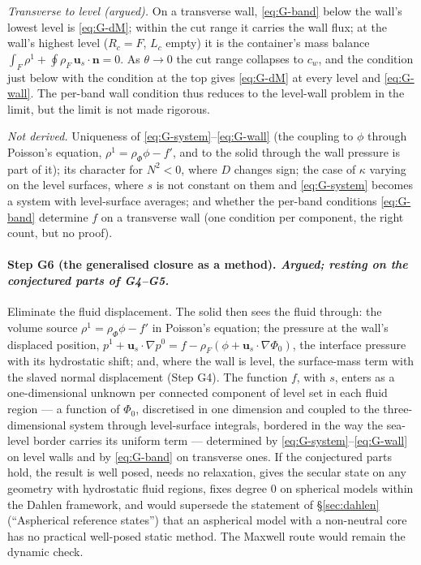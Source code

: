 \documentclass[11pt]{article}
\newcommand{\bu}{\mathbf{u}}
\newcommand{\bn}{\mathbf{n}}
\begin{document}
\emph{Transverse to level (argued).} On a transverse wall,
\eqref{eq:G-band} below the wall's lowest level is \eqref{eq:G-dM};
within the cut range it carries the wall flux; at the wall's highest
level ($R_c = F$, $L_c$ empty) it is the container's mass balance
$\int_F\rho^1 + \oint\rho_F\,\bu_s\cdot\bn = 0$. As $\theta \to 0$ the
cut range collapses to $c_w$, and the condition just below with the
condition at the top gives \eqref{eq:G-dM} at every level and
\eqref{eq:G-wall}. The per-band wall condition thus reduces to the
level-wall problem in the limit, but the limit is not made rigorous.

\emph{Not derived.} Uniqueness of \eqref{eq:G-system}--\eqref{eq:G-wall}
(the coupling to $\phi$ through Poisson's equation, $\rho^1 = \rho_\Phi\phi
- f'$, and to the solid through the wall pressure is part of it); its
character for $N^2 < 0$, where $D$ changes sign; the case of $\kappa$
varying on the level surfaces, where $s$ is not constant on them and
\eqref{eq:G-system} becomes a system with level-surface averages; and
whether the per-band conditions \eqref{eq:G-band} determine $f$ on a
transverse wall (one condition per component, the right count, but no
proof).

\paragraph{Step G6 (the generalised closure as a method).
\emph{Argued; resting on the conjectured parts of G4--G5.}} Eliminate
the fluid displacement. The solid then sees the fluid through: the
volume source $\rho^1 = \rho_\Phi\phi - f'$ in Poisson's equation; the
pressure at the wall's displaced position, $p^1 + \bu_s\cdot\nabla p^0 =
f - \rho_F(\phi + \bu_s\cdot\nabla\Phi_0)$, the interface pressure with
its hydrostatic shift; and, where the wall is level, the surface-mass
term with the slaved normal displacement (Step G4). The function $f$,
with $s$, enters as a one-dimensional unknown per connected component
of level set in each fluid region --- a function of $\Phi_0$, discretised
in one dimension and coupled to the three-dimensional system through
level-surface integrals, bordered in the way the sea-level border carries
its uniform term --- determined by \eqref{eq:G-system}--\eqref{eq:G-wall}
on level walls and by \eqref{eq:G-band} on transverse ones. If the
conjectured parts hold, the result is well posed, needs no relaxation,
gives the secular state on any geometry with hydrostatic fluid regions,
fixes degree 0 on spherical models within the Dahlen framework, and
would supersede the statement of \S\ref{sec:dahlen} (``Aspherical
reference states'') that an aspherical model with a non-neutral core has
no practical well-posed static method. The Maxwell route would remain
the dynamic check.
\end{document}
